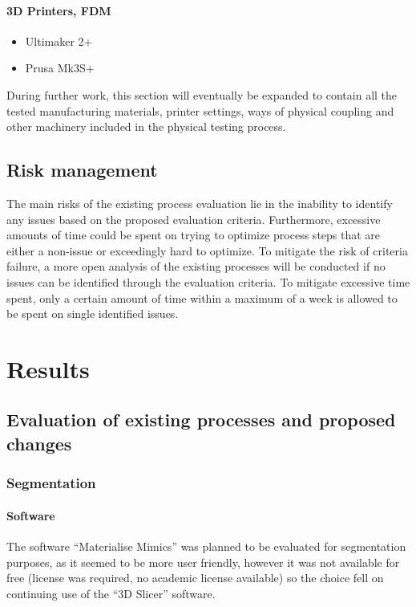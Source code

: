 \documentclass[MME,Projekt,english]{twbook}%
\begin{document}
\subsubsection{3D Printers, FDM}

\begin{itemize}
	\item Ultimaker 2+
	\item Prusa Mk3S+
\end{itemize}

During further work, this section will eventually be expanded to contain all the tested manufacturing materials, printer settings, ways of physical coupling and other machinery included in the physical testing process.

\section{Risk management}

The main risks of the existing process evaluation lie in the inability to identify any issues based on the proposed evaluation criteria. Furthermore, excessive amounts of time could be spent on trying to optimize process steps that are either a non-issue or exceedingly hard to optimize. To mitigate the risk of criteria failure, a more open analysis of the existing processes will be conducted if no issues can be identified through the evaluation criteria. To mitigate excessive time spent, only a certain amount of time within a maximum of a week is allowed to be spent on single identified issues.

\chapter{Results}

\section{Evaluation of existing processes and proposed changes}

\subsection{Segmentation}

\subsubsection{Software}

The software “Materialise Mimics” was planned to be evaluated for segmentation purposes, as it seemed to be more user friendly, however it was not available for free (license was required, no academic license available) so the choice fell on continuing use of the “3D Slicer” software.
\end{document}
